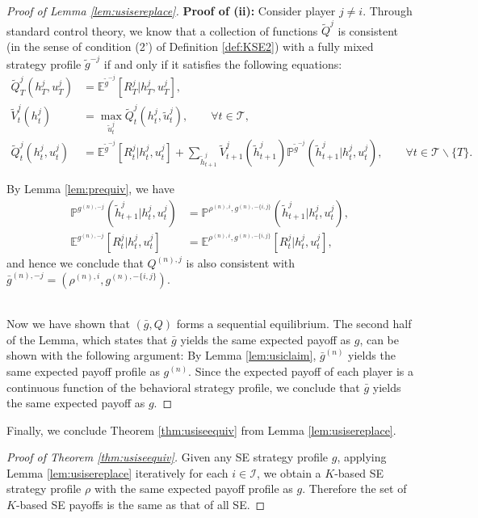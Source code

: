 \documentclass[pdflatex,sn-basic]{sn-jnl}
\newcommand{\E}{\mathbb{E}}
\renewcommand{\Pr}{\mathbb{P}}
\newcommand{\Qfunc}{Q}
\newcommand{\Comp}{K}
\theoremstyle{thmstyleone}%
\theoremstyle{thmstyletwo}%
\theoremstyle{thmstylethree}%
\begin{document}
\begin{appendices}
\begin{proof}[Proof of Lemma \ref{lem:usisereplace}]
	\textbf{Proof of (ii):} Consider player $j\neq i$. Through standard control theory, we know that a collection of functions $\tilde{\Qfunc}^{j}$ is consistent (in the sense of condition (2') of Definition \ref{def:KSE2}) with a fully mixed strategy profile $\tilde{g}^{-j}$ if and only if it satisfies the following equations:
    \begin{subequations}
	\begin{align}
		\tilde{\Qfunc}_T^{j}(h_T^j, u_T^j) &= \E^{\tilde{g}^{-j}}[R_T^j|h_T^j, u_T^j],\\
		\tilde{V}_t^{j}(h_t^j) &= \max_{\tilde{u}_t^j} \tilde{\Qfunc}_t^{j}(h_t^j, \tilde{u}_t^j), \qquad\forall t\in\mathcal{T},\\
		\tilde{\Qfunc}_{t}^{j}(h_t^j, u_t^j) &= \E^{\tilde{g}^{-j}}[R_t^j|h_t^j, u_t^j] + \sum_{\tilde{h}_{t+1}^j} \tilde{V}_{t+1}^{ j}(\tilde{h}_{t+1}^j)\Pr^{\tilde{g}^{-j}}(\tilde{h}_{t+1}^j|h_t^j, u_t^j),\qquad\forall t\in\mathcal{T}\backslash\{T\}.        
	\end{align}
    \end{subequations}
	
	By Lemma \ref{lem:prequiv}, we have
	\begin{align}
		\Pr^{g^{(n), -j}}(\tilde{h}_{t+1}^j|h_t^j, u_t^j) &= \Pr^{\rho^{(n), i}, g^{(n), -\{i, j\}}}(\tilde{h}_{t+1}^j|h_t^j, u_t^j),\\
		\E^{g^{(n), -j}}[R_t^j|h_t^j, u_t^j] &= \E^{\rho^{(n), i}, g^{(n), -\{i, j\}}}[R_t^j|h_t^j, u_t^j],
	\end{align}
	and hence we conclude that $\Qfunc^{(n), j}$ is also consistent with $\bar{g}^{(n), -j} = (\rho^{(n), i}, g^{(n), -\{i, j\}})$. \\~
	
	{Now we have shown that $(\bar{g}, \Qfunc)$ forms a sequential equilibrium. The second half of the Lemma, which states that $\bar{g}$ yields the same expected payoff as $g$, can be shown with the following argument:}
	By Lemma \ref{lem:usiclaim}, $\bar{g}^{(n)}$ yields the same expected payoff profile as $g^{(n)}$. Since the expected payoff of each player is a continuous function of the behavioral strategy profile, we conclude that $\bar{g}$ yields the same expected payoff as $g$.
\end{proof}

{Finally, we conclude Theorem \ref{thm:usiseequiv} from Lemma \ref{lem:usisereplace}.}

\begin{proof}[Proof of Theorem \ref{thm:usiseequiv}]
	Given any SE strategy profile $g$, applying Lemma \ref{lem:usisereplace} iteratively for each $i\in\mathcal{I}$, we obtain a $\Comp$-based SE strategy profile $\rho$ with the same expected payoff profile as $g$. Therefore the set of $\Comp$-based SE payoffs is the same as that of all SE.
\end{proof}


\end{appendices}
\end{document}
